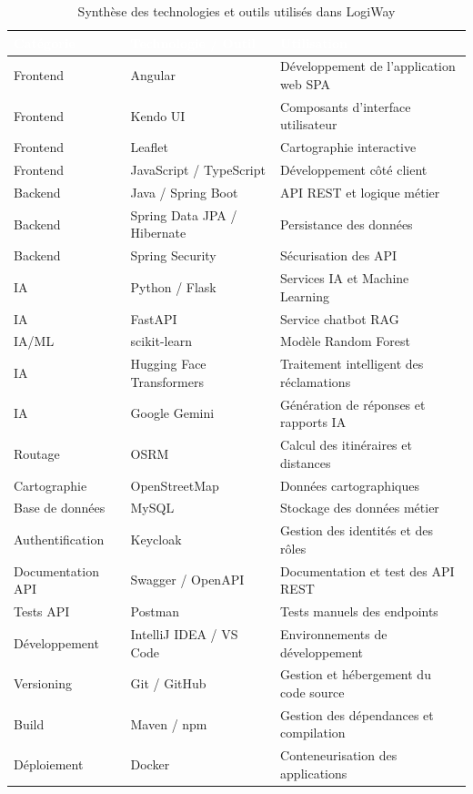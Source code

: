 \documentclass[12pt,a4paper]{report}
\newcommand{\thead}[1]{\cellcolor{tablehead}\textcolor{white}{\textbf{#1}}}
\begin{document}
\begin{table}[H]
    \centering
    \caption{Synthèse des technologies et outils utilisés dans LogiWay}
    \label{tab:technologies_logiway}
    \begin{tabularx}{\textwidth}{|l|l|Y|}
        \hline
        \thead{Catégorie} & \thead{Technologie / Outil} & \thead{Utilisation} \\
        \hline
        Frontend & Angular & Développement de l'application web SPA \\
        Frontend & Kendo UI & Composants d'interface utilisateur \\
        Frontend & Leaflet & Cartographie interactive \\
        Frontend & JavaScript / TypeScript & Développement côté client \\
        Backend & Java / Spring Boot & API REST et logique métier \\
        Backend & Spring Data JPA / Hibernate & Persistance des données \\
        Backend & Spring Security & Sécurisation des API \\
        IA & Python / Flask & Services IA et Machine Learning \\
        IA & FastAPI & Service chatbot RAG \\
        IA/ML & scikit-learn & Modèle Random Forest \\
        IA & Hugging Face Transformers & Traitement intelligent des réclamations \\
        IA & Google Gemini & Génération de réponses et rapports IA \\
        Routage & OSRM & Calcul des itinéraires et distances \\
        Cartographie & OpenStreetMap & Données cartographiques \\
        Base de données & MySQL & Stockage des données métier \\
        Authentification & Keycloak & Gestion des identités et des rôles \\
        Documentation API & Swagger / OpenAPI & Documentation et test des API REST \\
        Tests API & Postman & Tests manuels des endpoints \\
        Développement & IntelliJ IDEA / VS Code & Environnements de développement \\
        Versioning & Git / GitHub & Gestion et hébergement du code source \\
        Build & Maven / npm & Gestion des dépendances et compilation \\
        Déploiement & Docker & Conteneurisation des applications \\
        \hline
    \end{tabularx}
\end{table}
\end{document}
